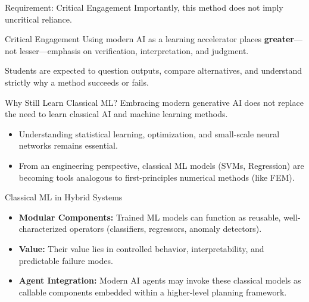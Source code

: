 \documentclass[german,10pt]{beamer}
\begin{document}
\begin{frame}{Requirement: Critical Engagement}
    \justifying
    Importantly, this method does not imply uncritical reliance.
    
    \begin{warningbox}{Critical Engagement}
    Using modern AI as a learning accelerator places \textbf{greater}—not lesser—emphasis on verification, interpretation, and judgment.
    \end{warningbox}
    
    Students are expected to question outputs, compare alternatives, and understand strictly why a method succeeds or fails.
\end{frame}

\begin{frame}{Why Still Learn Classical ML?}
    \justifying
    Embracing modern generative AI does not replace the need to learn classical AI and machine learning methods.
    \begin{itemize}
        \item Understanding statistical learning, optimization, and small-scale neural networks remains essential.
        \item From an engineering perspective, classical ML models (SVMs, Regression) are becoming tools analogous to first-principles numerical methods (like FEM).
    \end{itemize}
\end{frame}

\begin{frame}{Classical ML in Hybrid Systems}
    \justifying
    \begin{itemize}
        \item \textbf{Modular Components:} Trained ML models can function as reusable, well-characterized operators (classifiers, regressors, anomaly detectors).
        \item \textbf{Value:} Their value lies in controlled behavior, interpretability, and predictable failure modes.
        \item \textbf{Agent Integration:} Modern AI agents may invoke these classical models as callable components embedded within a higher-level planning framework.
    \end{itemize}
\end{frame}
\end{document}
